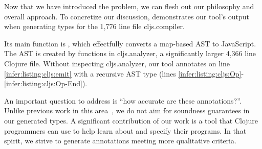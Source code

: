 \label{infer:sec:overview}

%

Now that we have introduced the problem,
we can flesh out our philosophy and overall
approach. To concretize our discussion,
 demonstrates our tool's output
when generating types for the 1,776 line file cljs.compiler.

Its main function is , which
effectfully converts a map-based AST
to JavaScript.
The AST is created by functions in cljs.analyzer,
a significantly larger 4,366 line Clojure file.
Without inspecting cljs.analyzer,
our tool annotates  on line \ref{infer:listing:cljs:emit}
with a recursive AST type  (lines \ref{infer:listing:cljs:Op}-\ref{infer:listing:cljs:Op-End}).

%




An important question to address is ``how accurate are these annotations?''.
Unlike previous work in this area~\cite{An10dynamicinference}, we do not aim for soundness guarantees
in our generated types. 
A significant contribution of our work is a tool that Clojure programmers
can use to help learn about and specify their programs.
In that spirit, we strive to generate annotations meeting more qualitative criteria.

